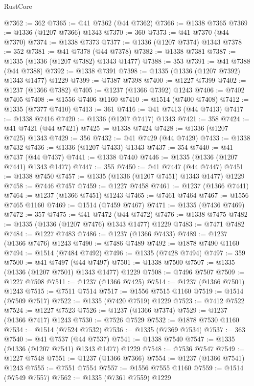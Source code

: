 \begin{lexlean}{RustCore}
\begin{coremodule}
@7362 := 362
@7365 := @41 @7362 (@44 @7362)
@7366 := @1338 @7365
@7369 := @1336 (@1207 @7366) @1343
@7370 := 360
@7373 := @41 @7370 (@44 @7370)
@7374 := @1338 @7373
@7377 := @1336 (@1207 @7374) @1343
@7378 := 352
@7381 := @41 @7378 (@44 @7378)
@7382 := @1338 @7381
@7387 := @1335 (@1336 (@1207 @7382) @1343 @1477)
@7388 := 353
@7391 := @41 @7388 (@44 @7388)
@7392 := @1338 @7391
@7398 := @1335 (@1336 (@1207 @7392) @1343 @1477) @1229
@7399 := @7387 @7398
@7400 := @1227 @7399
@7402 := @1237 (@1366 @7382)
@7405 := @1237 (@1366 @7392) @1243
@7406 := @7402 @7405
@7408 := @1556 @7406 @1160
@7410 := @1514 (@7400 @7408)
@7412 := @1335 (@7377 @7410)
@7413 := 361
@7416 := @41 @7413 (@44 @7413)
@7417 := @1338 @7416
@7420 := @1336 (@1207 @7417) @1343
@7421 := 358
@7424 := @41 @7421 (@44 @7421)
@7425 := @1338 @7424
@7428 := @1336 (@1207 @7425) @1343
@7429 := 356
@7432 := @41 @7429 (@44 @7429)
@7433 := @1338 @7432
@7436 := @1336 (@1207 @7433) @1343
@7437 := 354
@7440 := @41 @7437 (@44 @7437)
@7441 := @1338 @7440
@7446 := @1335 (@1336 (@1207 @7441) @1343 @1477)
@7447 := 355
@7450 := @41 @7447 (@44 @7447)
@7451 := @1338 @7450
@7457 := @1335 (@1336 (@1207 @7451) @1343 @1477) @1229
@7458 := @7446 @7457
@7459 := @1227 @7458
@7461 := @1237 (@1366 @7441)
@7464 := @1237 (@1366 @7451) @1243
@7465 := @7461 @7464
@7467 := @1556 @7465 @1160
@7469 := @1514 (@7459 @7467)
@7471 := @1335 (@7436 @7469)
@7472 := 357
@7475 := @41 @7472 (@44 @7472)
@7476 := @1338 @7475
@7482 := @1335 (@1336 (@1207 @7476) @1343 @1477) @1229
@7483 := @7471 @7482
@7484 := @1227 @7483
@7486 := @1237 (@1366 @7433)
@7489 := @1237 (@1366 @7476) @1243
@7490 := @7486 @7489
@7492 := @1878 @7490 @1160
@7494 := @1514 (@7484 @7492)
@7496 := @1335 (@7428 @7494)
@7497 := 359
@7500 := @41 @7497 (@44 @7497)
@7501 := @1338 @7500
@7507 := @1335 (@1336 (@1207 @7501) @1343 @1477) @1229
@7508 := @7496 @7507
@7509 := @1227 @7508
@7511 := @1237 (@1366 @7425)
@7514 := @1237 (@1366 @7501) @1243
@7515 := @7511 @7514
@7517 := @1556 @7515 @1160
@7519 := @1514 (@7509 @7517)
@7522 := @1335 (@7420 @7519) @1229
@7523 := @7412 @7522
@7524 := @1227 @7523
@7526 := @1237 (@1366 @7374)
@7529 := @1237 (@1366 @7417) @1243
@7530 := @7526 @7529
@7532 := @1878 @7530 @1160
@7534 := @1514 (@7524 @7532)
@7536 := @1335 (@7369 @7534)
@7537 := 363
@7540 := @41 @7537 (@44 @7537)
@7541 := @1338 @7540
@7547 := @1335 (@1336 (@1207 @7541) @1343 @1477) @1229
@7548 := @7536 @7547
@7549 := @1227 @7548
@7551 := @1237 (@1366 @7366)
@7554 := @1237 (@1366 @7541) @1243
@7555 := @7551 @7554
@7557 := @1556 @7555 @1160
@7559 := @1514 (@7549 @7557)
@7562 := @1335 (@7361 @7559) @1229

\end{coremodule}
\end{lexlean}
